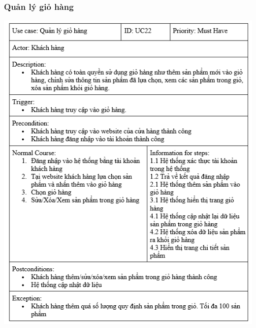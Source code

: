 \documentclass[12pt,a4paper,2sides]{report}
\begin{document}
\subsubsection{Quản lý giỏ hàng}
    \includegraphics[width=1\linewidth]{lib/usecase/quanlygiohang.png}\\\vspace*{1cm}    
\end{document}
